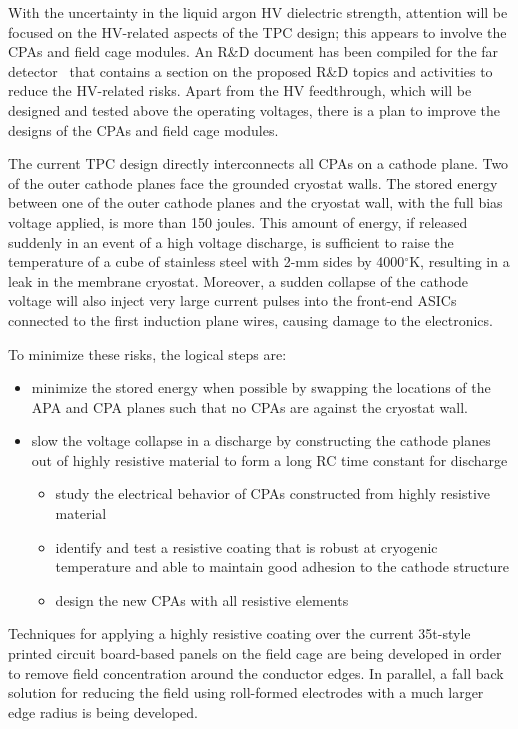 With the uncertainty in the liquid argon HV dielectric strength, attention will be focused on the HV-related aspects of the TPC design; this appears to involve the CPAs and field cage modules.  An R\&D document has been compiled for the far detector~\cite{fd_rndplan_10006} that contains a section on the proposed R\&D topics and activities to reduce the HV-related risks. Apart from the HV feedthrough, which will be designed and tested above the operating voltages, there is a plan to improve the designs of the CPAs and field cage modules.
 
The current TPC design directly interconnects all CPAs on a cathode plane. Two of the outer cathode planes face the grounded cryostat walls. The stored energy between one of the outer cathode planes and the cryostat wall, with the full bias voltage applied, is more than 150 joules\cite{ve-fd_025_8920}. This amount of energy, if released suddenly in an event of a high voltage discharge, is sufficient to raise the temperature of a cube of stainless steel with 2-mm sides by 4000$^\circ$K, resulting in a leak in the membrane cryostat. Moreover, a sudden collapse of the cathode voltage will also inject very large current pulses into the front-end ASICs connected to the first induction plane wires, causing damage to the electronics.
 
To minimize these risks, the logical steps are:
\begin{itemize}
\item minimize the stored energy when possible by swapping the locations of the APA and CPA planes such that no CPAs are against the cryostat wall.
\item slow the voltage collapse in a discharge by constructing the cathode planes out of highly resistive material to form a long RC time constant for discharge
\begin{itemize}
\item study the electrical behavior of CPAs constructed from highly resistive material
\item identify and test a resistive coating that is robust at cryogenic temperature and able to maintain good adhesion to the cathode structure
\item design the new CPAs with all resistive elements
\end{itemize}
\end{itemize}
 
Techniques for applying a highly resistive coating over the current 35t-style printed circuit board-based panels on the field cage are being developed in order to remove field concentration around the conductor edges.
In parallel, a fall back solution for reducing the field using roll-formed electrodes with a much larger edge radius is being developed.
 
